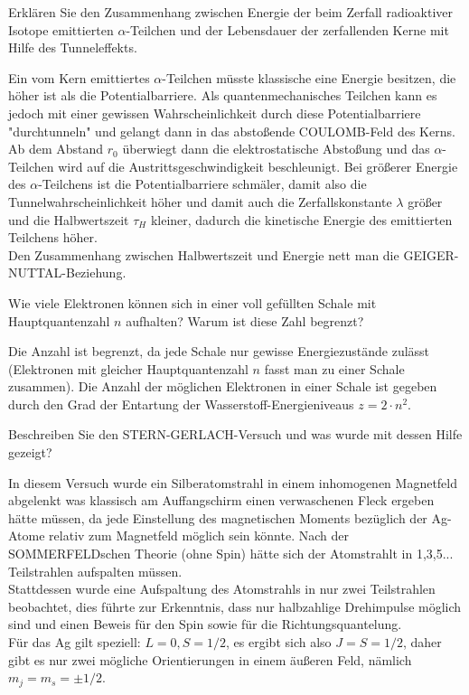 \documentclass[12pt,a4paper,ngerman]{article}
\begin{document}
\begin{framed}
Erklären Sie den Zusammenhang zwischen Energie der beim Zerfall radioaktiver Isotope emittierten $\alpha$-Teilchen und der Lebensdauer der zerfallenden Kerne mit Hilfe des Tunneleffekts.
\end{framed}
Ein vom Kern emittiertes $\alpha$-Teilchen müsste klassische eine Energie besitzen, die höher ist als die Potentialbarriere. Als quantenmechanisches Teilchen kann es jedoch mit einer gewissen Wahrscheinlichkeit durch diese Potentialbarriere "durchtunneln" und gelangt dann in das abstoßende COULOMB-Feld des Kerns. Ab dem Abstand $r_0$ überwiegt dann die elektrostatische Abstoßung und das $\alpha$-Teilchen wird auf die Austrittsgeschwindigkeit beschleunigt. Bei größerer Energie des $\alpha$-Teilchens ist die Potentialbarriere schmäler, damit also die Tunnelwahrscheinlichkeit höher und damit auch die Zerfallskonstante $\lambda$ größer und die Halbwertszeit $\tau_H$ kleiner, dadurch die kinetische Energie des emittierten Teilchens höher. \\
Den Zusammenhang zwischen Halbwertszeit und Energie nett man die GEIGER-NUTTAL-Beziehung. 

\pagebreak

\begin{framed}
Wie viele Elektronen können sich in einer voll gefüllten Schale mit Hauptquantenzahl $n$ aufhalten? Warum ist diese Zahl begrenzt?
\end{framed}

Die Anzahl ist begrenzt, da jede Schale nur gewisse Energiezustände zulässt (Elektronen mit gleicher Hauptquantenzahl $n$ fasst man zu einer Schale zusammen). Die Anzahl der möglichen Elektronen in einer Schale ist gegeben durch den Grad der Entartung der Wasserstoff-Energieniveaus $z = 2 \cdot n^2$. 


\begin{framed}
Beschreiben Sie den STERN-GERLACH-Versuch und was wurde mit dessen Hilfe gezeigt?
\end{framed}
In diesem Versuch wurde ein Silberatomstrahl in einem inhomogenen Magnetfeld abgelenkt was klassisch am Auffangschirm einen verwaschenen Fleck ergeben hätte müssen, da jede Einstellung des magnetischen Moments bezüglich der Ag-Atome relativ zum Magnetfeld möglich sein könnte. 
Nach der SOMMERFELDschen Theorie (ohne Spin) hätte sich der Atomstrahlt in 1,3,5... Teilstrahlen aufspalten müssen. \\
Stattdessen wurde eine Aufspaltung des Atomstrahls in nur zwei Teilstrahlen beobachtet, dies führte zur Erkenntnis, dass nur halbzahlige Drehimpulse möglich sind und einen Beweis für den Spin sowie für die Richtungsquantelung. \\
Für das Ag gilt speziell: $L=0, S=1/2$, es ergibt sich also $J = S = 1/2$, daher gibt es nur zwei mögliche Orientierungen in einem äußeren Feld, nämlich $m_j = m_s = \pm 1/2$. 
\end{document}
